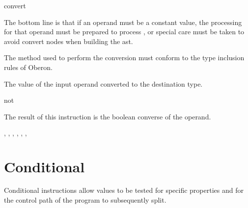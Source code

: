 \begin{instruction}{convert}
\begin{notes}
    The bottom line is that if an operand must be a constant value,
    the processing for that operand must be prepared to process
    , or special care must be taken to avoid convert
    nodes when building the \ac{ast}.

    The method used to perform the conversion must conform to the type
    inclusion rules of Oberon.
  \end{notes}

  \begin{results}
  \item The value of the input operand converted to the destination type.
  \end{results}

  \begin{operands}
  \item {}
  \end{operands}
\end{instruction}

\begin{instruction}{not}

  \begin{results}
  \item The result of this instruction is the boolean converse of the
    operand.
  \end{results}

  \begin{operands}
  \item {}
  \end{operands}

  \begin{seealso}
    ,
    ,
    ,
    ,
    ,
    ,
  \end{seealso}
\end{instruction}


\section{Conditional}\label{class:conditional}
Conditional instructions allow values to be tested for specific
properties and for the control path of the program to subsequently
split.

